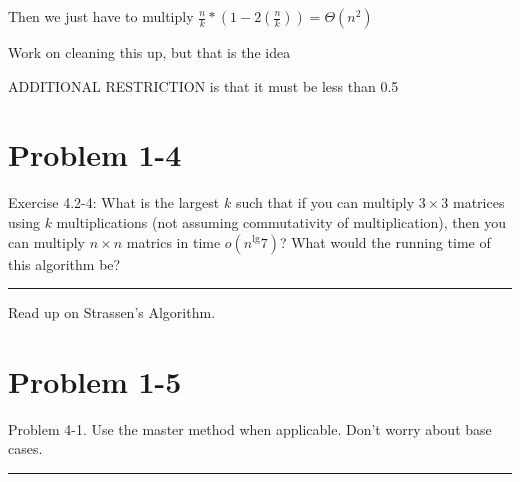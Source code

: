 \documentclass[11pt]{article}
\def\separateline{\medskip\hrule\medskip}
\begin{document}
Then we just have to multiply $\frac{n}{k} * (1 - 2(\frac{n}{k})) = \Theta(n^2)$

Work on cleaning this up, but that is the idea

ADDITIONAL RESTRICTION is that it must be less than 0.5

\newpage

\section{Problem 1-4}
Exercise 4.2-4: What is the largest $k$ such that if you can multiply $3 \times 3$ matrices using $k$ multiplications (not assuming commutativity of multiplication), then you can multiply $n \times n$ matrics in time $o(n^\lg{7})$? What would the running time of this algorithm be?
\separateline

Read up on Strassen's Algorithm.

\newpage

\section{Problem 1-5}
Problem 4-1. Use the master method when applicable. Don’t worry about base cases.
\separateline
\end{document}
